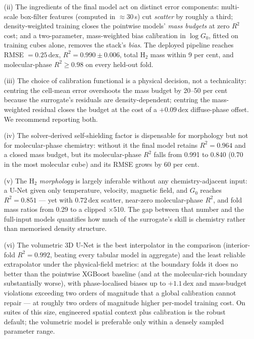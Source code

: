\documentclass[fleqn,usenatbib]{rasti}
\newcommand{\Gzero}{G_0}
\newcommand{\dex}{\,\text{dex}}
\newcommand{\Rsq}{R^2}
\begin{document}
(ii) The ingredients of the final model act on distinct error
components: multi-scale box-filter features (computed in
\(\approx\)30\,s) cut \emph{scatter} by roughly a third; density-weighted
training closes the pointwise models' \emph{mass budgets} at zero
\(\Rsq\) cost; and a two-parameter, mass-weighted bias calibration in
\(\log\Gzero\), fitted on training cubes alone, removes the stack's
\emph{bias}. The deployed pipeline reaches RMSE \(= 0.25\dex\),
\(\Rsq = 0.990 \pm 0.006\), total H\(_2\) mass within 9 per cent, and
molecular-phase \(\Rsq \ge 0.98\) on every held-out fold.

(iii) The choice of calibration functional is a physical decision, not
a technicality: centring the cell-mean error overshoots the mass budget
by 20--50 per cent because the surrogate's residuals are
density-dependent; centring the mass-weighted residual closes the
budget at the cost of a \(+0.09\dex\) diffuse-phase offset. We recommend
reporting both.

(iv) The solver-derived self-shielding factor is dispensable for
morphology but not for molecular-phase chemistry: without it the final
model retains \(\Rsq = 0.964\) and a closed mass budget, but its
molecular-phase \(\Rsq\) falls from 0.991 to 0.840 (0.70 in the most
molecular cube) and its RMSE grows by 60 per cent.

(v) The H\(_2\) \emph{morphology} is largely inferable without any
chemistry-adjacent input: a U-Net given only temperature, velocity,
magnetic field, and \(\Gzero\) reaches \(\Rsq = 0.851\) --- yet with
\(0.72\dex\) scatter, near-zero molecular-phase \(\Rsq\), and fold mass
ratios from 0.29 to a clipped \(\times\)510. The gap between that number
and the full-input models quantifies how much of the surrogate's skill
is chemistry rather than memorised density structure.

(vi) The volumetric 3D U-Net is the best interpolator in the comparison
(interior-fold \(\Rsq = 0.992\), beating every tabular model in
aggregate) and the
least reliable extrapolator under the physical-field metrics: at the
boundary folds it does no better than the pointwise XGBoost baseline
(and at the molecular-rich boundary substantially worse),
with phase-localised biases up to \(+1.1\dex\) and
mass-budget violations exceeding two orders of magnitude that a global
calibration cannot repair --- at roughly two orders of magnitude higher
per-model training cost. On suites of this size, engineered spatial context plus
calibration is the robust default; the volumetric model is preferable
only within a densely sampled parameter range.
\end{document}
